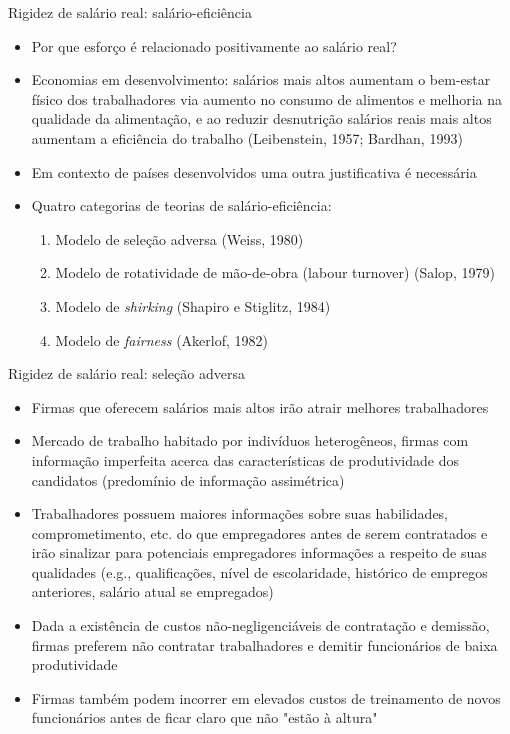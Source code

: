 \documentclass[10pt]{beamer}
\begin{document}
\begin{frame}{Rigidez de salário real: salário-eficiência}
    \begin{itemize}
        \item Por que esforço é relacionado positivamente ao salário real?\bigskip
        \item Economias em desenvolvimento: salários mais altos aumentam o bem-estar físico dos trabalhadores via aumento no consumo de alimentos e melhoria na qualidade da alimentação, e ao reduzir desnutrição salários reais mais altos aumentam a eficiência do trabalho (Leibenstein, 1957; Bardhan, 1993)\bigskip
        \item Em contexto de países desenvolvidos uma outra justificativa é necessária\bigskip
        \item Quatro categorias de teorias de salário-eficiência:\bigskip
        \begin{enumerate}
            \item Modelo de seleção adversa (Weiss, 1980)\bigskip
            \item Modelo de rotatividade de mão-de-obra (labour turnover) (Salop, 1979)\bigskip
            \item Modelo de \emph{shirking} (Shapiro e Stiglitz, 1984)\bigskip
            \item Modelo de \emph{fairness} (Akerlof, 1982)
        \end{enumerate}
    \end{itemize}
\end{frame}

\begin{frame}{Rigidez de salário real: seleção adversa}
    \begin{itemize}
        \item Firmas que oferecem salários mais altos irão atrair melhores trabalhadores\bigskip
        \item Mercado de trabalho habitado por indivíduos heterogêneos, firmas com informação imperfeita acerca das características de produtividade dos candidatos (predomínio de informação assimétrica)\bigskip
        \item Trabalhadores possuem maiores informações sobre suas habilidades, comprometimento, etc. do que empregadores antes de serem contratados e irão sinalizar para potenciais empregadores informações a respeito de suas qualidades (e.g., qualificações, nível de escolaridade, histórico de empregos anteriores, salário atual se empregados)\bigskip
        \item Dada a existência de custos não-negligenciáveis de contratação e demissão, firmas preferem não contratar trabalhadores e demitir funcionários de baixa produtividade\bigskip
        \item Firmas também podem incorrer em elevados custos de treinamento de novos funcionários antes de ficar claro que não "estão à altura"
    \end{itemize}
\end{frame}
\end{document}
